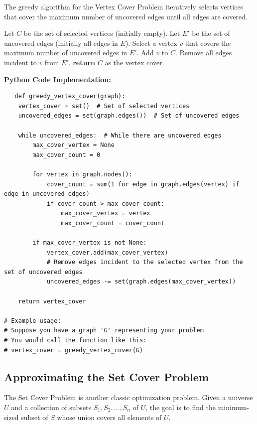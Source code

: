 \documentclass[12pt]{book} %
\begin{document}
The greedy algorithm for the Vertex Cover Problem iteratively selects vertices that cover the maximum number of uncovered edges until all edges are covered.
\FloatBarrier
\begin{algorithm}[H]
\caption{Greedy Algorithm for Vertex Cover}
\begin{algorithmic}[1]
\State Let \( C \) be the set of selected vertices (initially empty).
\State Let \( E' \) be the set of uncovered edges (initially all edges in \( E \)).
    \State Select a vertex \( v \) that covers the maximum number of uncovered edges in \( E' \).
    \State Add \( v \) to \( C \).
    \State Remove all edges incident to \( v \) from \( E' \).
\EndWhile
\State \textbf{return} \( C \) as the vertex cover.
\end{algorithmic}
\end{algorithm}
\FloatBarrier
\textbf{Python Code Implementation:}
\FloatBarrier
\begin{lstlisting}
   def greedy_vertex_cover(graph):
    vertex_cover = set()  # Set of selected vertices
    uncovered_edges = set(graph.edges())  # Set of uncovered edges

    while uncovered_edges:  # While there are uncovered edges
        max_cover_vertex = None
        max_cover_count = 0

        for vertex in graph.nodes():
            cover_count = sum(1 for edge in graph.edges(vertex) if edge in uncovered_edges)
            if cover_count > max_cover_count:
                max_cover_vertex = vertex
                max_cover_count = cover_count

        if max_cover_vertex is not None:
            vertex_cover.add(max_cover_vertex)
            # Remove edges incident to the selected vertex from the set of uncovered edges
            uncovered_edges -= set(graph.edges(max_cover_vertex))

    return vertex_cover

# Example usage:
# Suppose you have a graph 'G' representing your problem
# You would call the function like this:
# vertex_cover = greedy_vertex_cover(G) 
\end{lstlisting}

\subsection{Approximating the Set Cover Problem}


The Set Cover Problem is another classic optimization problem. Given a universe \( U \) and a collection of subsets \( S_1, S_2, \ldots, S_n \) of \( U \), the goal is to find the minimum-sized subset of \( S \) whose union covers all elements of \( U \).
\end{document}
